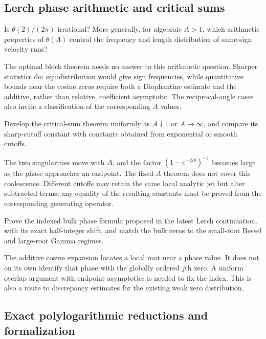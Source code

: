 \subsection{Lerch phase arithmetic and critical sums}

\begin{question}
Is $\theta(2)/(2\pi)$ irrational? More generally, for algebraic $A>1$,
which arithmetic properties of $\theta(A)$ control the frequency and
length distribution of same-sign velocity runs?
\end{question}
The optimal block theorem needs no answer to this arithmetic question.
Sharper statistics do: equidistribution would give sign frequencies,
while quantitative bounds near the cosine zeros require both a
Diophantine estimate and the additive, rather than relative, coefficient
asymptotic. The reciprocal-angle cases also invite a classification of
the corresponding $A$ values.

\begin{question}
Develop the critical-sum theorem uniformly as $A\downarrow1$ or
$A\to\infty$, and compare its sharp-cutoff constant with constants
obtained from exponential or smooth cutoffs.
\end{question}
The two singularities move with $A$, and the factor
$(1-e^{-2i\theta})^{-1}$ becomes large as the phase approaches an
endpoint. The fixed-$A$ theorem does not cover this coalescence.
Different cutoffs may retain the same local analytic jet but alter
subtracted terms; any equality of the resulting constants must be
proved from the corresponding generating operator.

\begin{question}
Prove the indexed bulk phase formula proposed in the latest Lerch
continuation, with its exact half-integer shift, and match the bulk
zeros to the small-root Bessel and large-root Gamma regimes.
\end{question}
The additive cosine expansion locates a local root near a phase value.
It does not on its own identify that phase with the globally ordered
$j$th zero. A uniform overlap argument with endpoint asymptotics is
needed to fix the index. This is also a route to discrepancy estimates
for the existing weak zero distribution.

\subsection{Exact polylogarithmic reductions and formalization}

